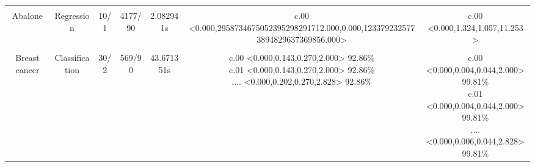 \documentclass[8pt, a4paper]{article}
\begin{document}
\begin{landscape}
\begin{tabular}{|c|c|c|c|c|c|c|}
\hline
\\
Abalone & Regression & 10/1 & 4177/90 & 2.082941s & \makecell{c.00 <0.000,2958734675052395298291712.000,0.000,1233792325773894829637369856.000>\\} & \makecell{c.00 <0.000,1.324,1.057,11.253>\\} \\
\hline
\\
Breast cancer & Classification & 30/2 & 569/90 & 43.671351s & \makecell{c.00 <0.000,0.143,0.270,2.000> 92.86\%\\c.01 <0.000,0.143,0.270,2.000> 92.86\%\\.... <0.000,0.202,0.270,2.828> 92.86\%\\} & \makecell{c.00 <0.000,0.004,0.044,2.000> 99.81\%\\c.01 <0.000,0.004,0.044,2.000> 99.81\%\\.... <0.000,0.006,0.044,2.828> 99.81\%\\} \\
\hline
\end{tabular}\newpage
\end{landscape}
\end{document}
